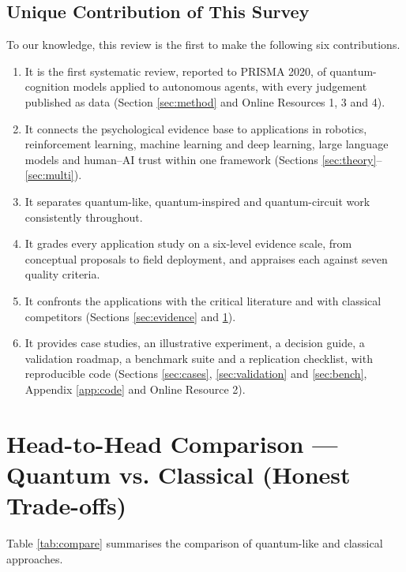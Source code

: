 \documentclass[pdflatex,sn-basic]{sn-jnl}
\begin{document}
\subsection{Unique Contribution of This Survey}\label{sec:contrib}
To our knowledge, this review is the first to make the following six contributions.

\begin{enumerate}
\item It is the first systematic review, reported to PRISMA 2020, of quantum-cognition models applied to autonomous agents, with every judgement published as data (Section \ref{sec:method} and Online Resources 1, 3 and 4).
\item It connects the psychological evidence base to applications in robotics, reinforcement learning, machine learning and deep learning, large language models and human--AI trust within one framework (Sections \ref{sec:theory}--\ref{sec:multi}).
\item It separates quantum-like, quantum-inspired and quantum-circuit work consistently throughout.
\item It grades every application study on a six-level evidence scale, from conceptual proposals to field deployment, and appraises each against seven quality criteria.
\item It confronts the applications with the critical literature and with classical competitors (Sections \ref{sec:evidence} and \ref{sec:compare}).
\item It provides case studies, an illustrative experiment, a decision guide, a validation roadmap, a benchmark suite and a replication checklist, with reproducible code (Sections \ref{sec:cases}, \ref{sec:validation} and \ref{sec:bench}, Appendix \ref{app:code} and Online Resource 2).
\end{enumerate}


\section{Head-to-Head Comparison --- Quantum vs. Classical (Honest Trade-offs)}\label{sec:compare}
Table \ref{tab:compare} summarises the comparison of quantum-like and classical approaches.
\end{document}
